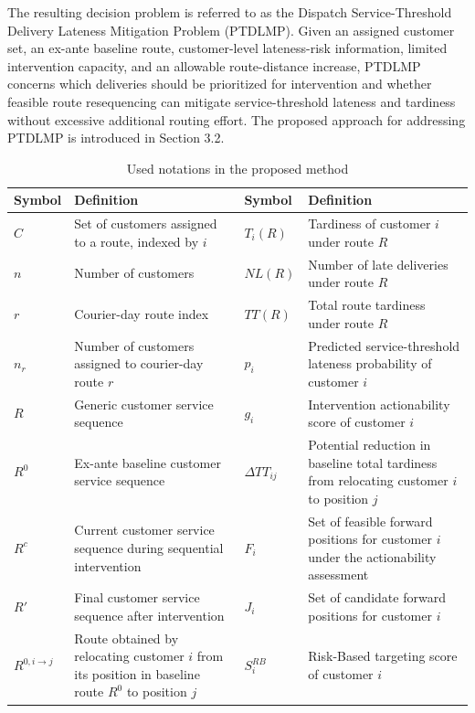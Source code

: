 \documentclass[11pt,a4paper]{article}
\begin{document}
The resulting decision problem is referred to as the Dispatch Service-Threshold
Delivery Lateness Mitigation Problem (PTDLMP). Given an assigned
customer set, an ex-ante baseline route, customer-level lateness-risk
information, limited intervention capacity, and an allowable
route-distance increase, PTDLMP concerns which deliveries should be
prioritized for intervention and whether feasible route resequencing can
mitigate service-threshold lateness and tardiness without excessive
additional routing effort. The proposed approach for addressing PTDLMP
is introduced in Section 3.2.

\begin{table}[htbp]
\centering
\caption{Used notations in the proposed method}
\label{tab:notations}
\small
\setlength{\tabcolsep}{4pt}
\renewcommand{\arraystretch}{1.12}
\begin{tabularx}{\textwidth}{@{}l>{\raggedright\arraybackslash}Xl>{\raggedright\arraybackslash}X@{}}
\toprule
\textbf{Symbol} & \textbf{Definition} & \textbf{Symbol} & \textbf{Definition} \\
\midrule
$C$ & Set of customers assigned to a route, indexed by $i$ & $T_{i}(R)$ & Tardiness of customer $i$ under route $R$ \\
$n$ & Number of customers & $NL(R)$ & Number of late deliveries under route $R$ \\
$r$ & Courier-day route index & $TT(R)$ & Total route tardiness under route $R$ \\
$n_{r}$ & Number of customers assigned to courier-day route $r$ & $p_{i}$ & Predicted service-threshold lateness probability of customer $i$ \\
$R$ & Generic customer service sequence & $g_{i}$ & Intervention actionability score of customer $i$ \\
$R^{0}$ & Ex-ante baseline customer service sequence & $\Delta TT_{ij}$ & Potential reduction in baseline total tardiness from relocating customer $i$ to position $j$ \\
$R^{c}$ & Current customer service sequence during sequential intervention & $F_{i}$ & Set of feasible forward positions for customer $i$ under the actionability assessment \\
$R'$ & Final customer service sequence after intervention & $J_{i}$ & Set of candidate forward positions for customer $i$ \\
$R^{0,i \rightarrow j}$ & Route obtained by relocating customer $i$ from its position in baseline route $R^{0}$ to position $j$ & $S_{i}^{RB}$ & Risk-Based targeting score of customer $i$ \\

\end{tabularx}
\end{table}
\end{document}

